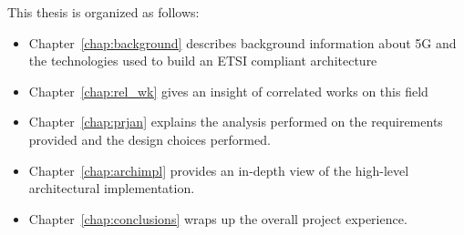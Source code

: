  This thesis is organized as follows:
 \begin{itemize}
  \item Chapter~\ref{chap:background} describes background information about 5G 
and the technologies used to build an ETSI compliant architecture
  \item Chapter~\ref{chap:rel_wk} gives an insight of correlated works on this 
field
  \item Chapter~\ref{chap:prjan} explains the analysis performed on the 
requirements provided and the design choices performed.
  \item Chapter~\ref{chap:archimpl} provides an in-depth view of the 
high-level architectural implementation.
  \item Chapter~\ref{chap:conclusions} wraps up the overall project experience.
 \end{itemize}
